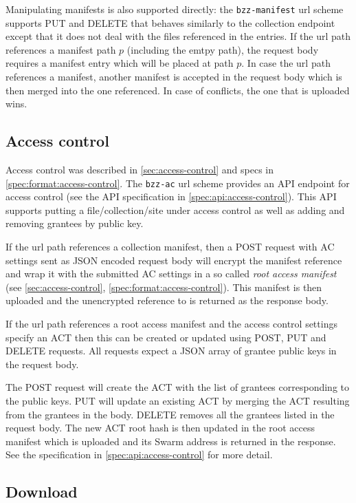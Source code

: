 Manipulating manifests is also supported directly: the \texttt{bzz-manifest} url scheme supports PUT and DELETE that behaves similarly to the collection  endpoint except that it does not deal with the files referenced in the entries. If the url path references a manifest path $p$ (including the emtpy path), the request body requires a manifest entry which will be placed at path $p$. In case the url path references a manifest, another manifest is accepted in the request body which is then merged into the one referenced. In case of conflicts, the one that is uploaded wins. 


\subsection{Access control}\label{sec:access-control-ux}

Access control was described in \ref{sec:access-control} and specs in \ref{spec:format:access-control}. The \texttt{bzz-ac} url scheme provides an API endpoint for access control (see the API specification in \ref{spec:api:access-control}). This API supports putting a file/collection/site under access control as well as adding and removing grantees by public key. 

If the url path references a collection manifest, then a POST request with AC settings sent as JSON encoded request body will encrypt the manifest reference and wrap it with the submitted AC settings in a so called \emph{root access manifest} (see \ref{sec:access-control}, \ref{spec:format:access-control}). This manifest is then  uploaded and the unencrypted reference to is returned as the response body. 

If the url path references a  root access manifest and the access  control settings specify an ACT then this can be created or updated using POST, PUT and DELETE requests. All requests expect a JSON array of grantee public keys in the request body.

The POST request will create the ACT with the list of grantees corresponding to the public keys. PUT will update an existing ACT by merging the ACT resulting from the grantees in the body. DELETE removes all the grantees listed in the request body. The new ACT root hash is then updated in the root access manifest which is uploaded and its Swarm address is returned in the response. See the specification in  \ref{spec:api:access-control} for more detail.


\subsection{Download}\label{sec:download}

